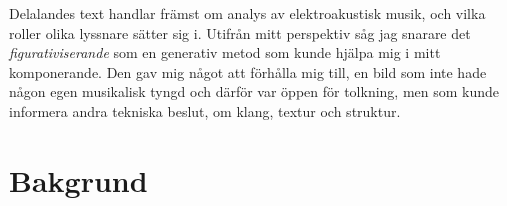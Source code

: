 \documentclass{article}
\begin{document}
Delalandes text handlar främst om analys av elektroakustisk musik, och vilka roller olika lyssnare sätter sig
i. Utifrån mitt perspektiv såg jag snarare det \emph{figurativiserande} som en generativ metod som kunde
hjälpa mig i mitt komponerande. Den gav mig något att förhålla mig till, en bild som inte hade någon egen
musikalisk tyngd och därför var öppen för tolkning, men som kunde informera andra tekniska beslut, om klang,
textur och struktur.










\section{Bakgrund}
\end{document}

